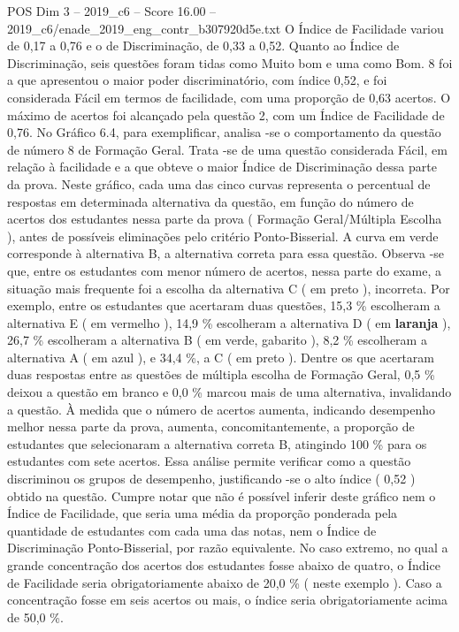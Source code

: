 \begin{textsample}{POS Dim 3 – 2019\_c6 – Score 16.00 – 2019\_c6/enade\_2019\_eng\_contr\_b307920d5e.txt}
O Índice de Facilidade variou de 0,17 a 0,76 e o de Discriminação, de 0,33 a 0,52.
Quanto ao Índice de Discriminação, seis questões foram tidas como Muito bom e uma como Bom. 8 foi a que apresentou o maior poder discriminatório, com índice 0,52, e foi considerada Fácil em termos de facilidade, com uma proporção de 0,63 acertos.
O máximo de acertos foi alcançado pela questão 2, com um Índice de Facilidade de 0,76.
No Gráfico 6.4, para exemplificar, analisa -se o comportamento da questão de número 8 de Formação Geral.
Trata -se de uma questão considerada Fácil, em relação à facilidade e a que obteve o maior Índice de Discriminação dessa parte da prova.
Neste gráfico, cada uma das cinco curvas representa o percentual de respostas em determinada alternativa da questão, em função do número de acertos dos estudantes nessa parte da prova ( Formação Geral/Múltipla Escolha ), antes de possíveis eliminações pelo critério Ponto-Bisserial.
A curva em verde corresponde à alternativa B, a alternativa correta para essa questão.
Observa -se que, entre os estudantes com menor número de acertos, nessa parte do exame, a situação mais frequente foi a escolha da alternativa C ( em preto ), incorreta.
Por exemplo, entre os estudantes que acertaram duas questões, 15,3 \% escolheram a alternativa E ( em vermelho ), 14,9 \% escolheram a alternativa D ( em \textbf{laranja} ), 26,7 \% escolheram a alternativa B ( em verde, gabarito ), 8,2 \% escolheram a alternativa A ( em azul ), e 34,4 \%, a C ( em preto ).
Dentre os que acertaram duas respostas entre as questões de múltipla escolha de Formação Geral, 0,5 \% deixou a questão em branco e 0,0 \% marcou mais de uma alternativa, invalidando a questão.
À medida que o número de acertos aumenta, indicando desempenho melhor nessa parte da prova, aumenta, concomitantemente, a proporção de estudantes que selecionaram a alternativa correta B, atingindo 100 \% para os estudantes com sete acertos.
Essa análise permite verificar como a questão discriminou os grupos de desempenho, justificando -se o alto índice ( 0,52 ) obtido na questão.
Cumpre notar que não é possível inferir deste gráfico nem o Índice de Facilidade, que seria uma média da proporção ponderada pela quantidade de estudantes com cada uma das notas, nem o Índice de Discriminação Ponto-Bisserial, por razão equivalente.
No caso extremo, no qual a grande concentração dos acertos dos estudantes fosse abaixo de quatro, o Índice de Facilidade seria obrigatoriamente abaixo de 20,0 \% ( neste exemplo ).
Caso a concentração fosse em seis acertos ou mais, o índice seria obrigatoriamente acima de 50,0 \%.

\end{textsample}
